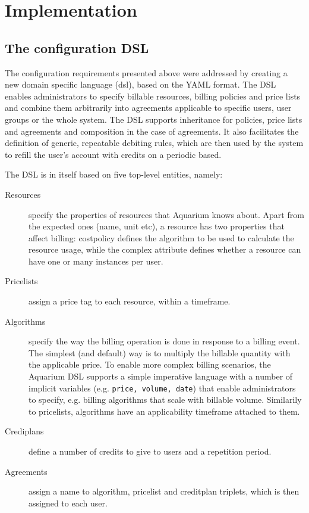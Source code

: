 \documentclass[preprint,10pt]{sigplanconf}
\begin{document}
\section{Implementation}


\subsection{The configuration DSL}
\label{sec:dsl}
The configuration requirements presented above were addressed by creating a new
domain specific language ({\sc dsl}), based on the YAML format.  The DSL
enables administrators to specify billable resources, billing policies and
price lists and combine them arbitrarily into agreements applicable to specific
users, user groups or the whole system. 
The DSL supports inheritance for policies, price lists and agreements and composition in the case of agreements.
It also facilitates the
definition of generic, repeatable debiting rules, which are then used by the
system to refill the user's account with credits on a periodic based.

The DSL is in itself based on five top-level entities, namely:

\begin{description}

    \item[Resources] specify the properties of resources that Aquarium knows
        about. Apart from the expected ones (name, unit etc), a resource has
        two properties that affect billing: \textsf{costpolicy} defines the
        algorithm to be used to calculate the resource usage, while the
        \textsf{complex} attribute defines whether a resource can have one or
        many instances per user.

    \item[Pricelists] assign a price tag to each resource, within a timeframe.
    
    \item[Algorithms] specify the way the billing operation is done in response
        to a billing event. The simplest (and default) way is to multiply the 
        billable quantity with the applicable price. To enable more complex billing
        scenarios, the Aquarium DSL supports a simple imperative language with
        a number of implicit variables (e.g. \texttt{price, volume, date}) 
        that enable administrators to specify, e.g. billing algorithms that
        scale with billable volume. Similarily to pricelists, algorithms
        have an applicability timeframe attached to them.

    \item[Crediplans] define a number of credits to give to users and a repetition
        period.

    \item[Agreements] assign a name to algorithm, pricelist and creditplan triplets,
        which is then assigned to each user.

\end{description}
\end{document}
